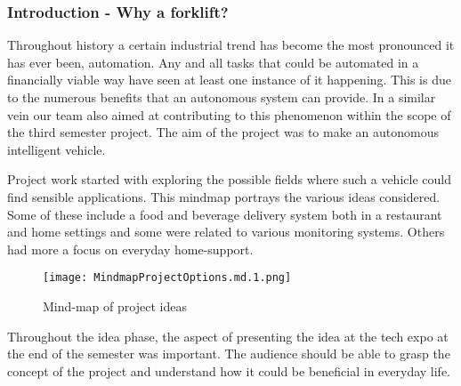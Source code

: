 \documentclass[../report.tex]{subfiles}
\begin{document}

\subsubsection{Introduction - Why a forklift?}
    Throughout history a certain industrial trend has become the most pronounced 
    it has ever been, automation. Any and all tasks that could be automated in a
    financially viable way have seen at least one instance of it happening. This
    is due to the numerous benefits that an autonomous system can provide. In a
    similar vein our team also aimed at contributing to this phenomenon within 
    the scope of the third semester project. The aim of the project was to make
    an autonomous intelligent vehicle.

    Project work started with exploring the possible fields where such a vehicle
    could find sensible applications. This mindmap portrays the various ideas considered. 
    Some of these include a food and beverage delivery system both in a restaurant and home
    settings and some were related to various monitoring systems. Others had more a focus
    on everyday home-support.

    \begin{figure}[H]
        \centering
        \texttt{[image: MindmapProjectOptions.md.1.png]}
        \caption{Mind-map of project ideas}
    \end{figure}   

    Throughout the idea phase, the aspect of presenting the idea at the tech
    expo at the end of the semester was important. The audience should be able
    to grasp the concept of the project and understand how it could be
    beneficial in everyday life.
\end{document}
